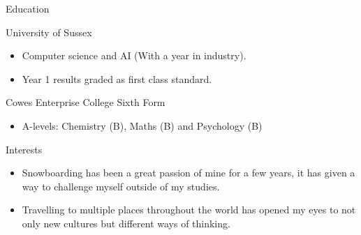 \documentclass[a4paper]{article}
\newlength{\tabin}
\newlength{\secsep}
\newcommand{\lineunder}{\vspace*{-8pt} \\ \hspace*{-6pt} \hrulefill \\ \vspace*{-15pt}}
\newenvironment{tabbedsection}[1]{
  \begin{list}{}{
      \setlength{\itemsep}{0pt}
      \setlength{\labelsep}{0pt}
      \setlength{\labelwidth}{0pt}
      \setlength{\leftmargin}{\tabin}
      \setlength{\rightmargin}{\tabin}
      \setlength{\listparindent}{0pt}
      \setlength{\parsep}{0pt}
      \setlength{\parskip}{0pt}
      \setlength{\partopsep}{0pt}
      \setlength{\topsep}{#1}
    }
  \item[]
}{\end{list}}
\newenvironment{resume_section}[1]{
  \filbreak
  \vspace{2\secsep}
  \textsc{\large#1}
  \lineunder
  \begin{tabbedsection}{\secsep}
}{\end{tabbedsection}}
\newenvironment{resume_subsection}[2][]{
  \textbf{#2} \hfill {\footnotesize #1} \hspace{2em}
  \begin{tabbedsection}{0.5\secsep}
}{\end{tabbedsection}}
\newenvironment{subitems}{
  \renewcommand{\labelitemi}{-}
  \begin{itemize}
      \setlength{\labelsep}{1em}
}{\end{itemize}}
\begin{document}
\begin{resume_section}{Education}
  \begin{resume_subsection}{University of Sussex}
    \begin{subitems}
      \item Computer science and AI (With a year in industry).
      \item Year 1 results graded as first class standard.
    \end{subitems}
  \end{resume_subsection}
  
  \begin{resume_subsection}{Cowes Enterprise College Sixth Form}
    \begin{subitems}
      \item A-levels: Chemistry (B), Maths (B) and Psychology (B)
     \end{subitems}
  \end{resume_subsection}
\end{resume_section}

\begin{resume_section}{Interests}
  \begin{subitems}
   \item Snowboarding has been a great passion of mine for a few years, it has given a way to challenge myself outside of my studies.
   \item Travelling to multiple places throughout the world has opened my eyes to not only new cultures but different ways of thinking.
   \end{subitems}
\end{resume_section}
\end{document}
